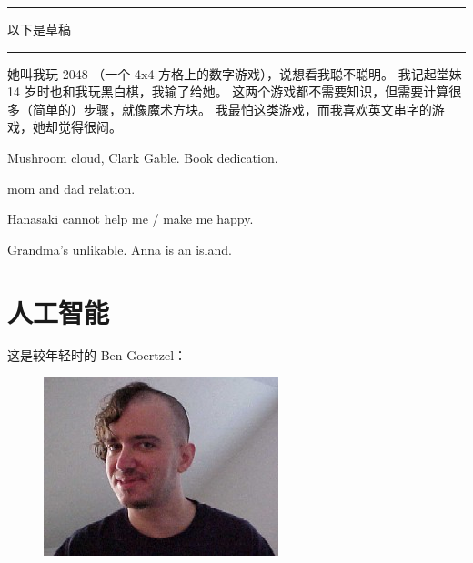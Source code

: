 \documentclass[12pt]{report}
\newcommand*\todo{\begin{center}\color{red}  \rule{5cm}{0.5pt} 以下是草稿\, \rule{5cm}{0.5pt} \end{center}}
\begin{document}
\todo

她叫我玩 2048 （一个 4x4 方格上的数字游戏），说想看我聪不聪明。 我记起堂妹 14 岁时也和我玩黑白棋，我输了给她。  这两个游戏都不需要知识，但需要计算很多（简单的）步骤，就像魔术方块。  我最怕这类游戏，而我喜欢英文串字的游戏，她却觉得很闷。

Mushroom cloud, Clark Gable.  Book dedication.

mom and dad relation.

Hanasaki cannot help me / make me happy.

Grandma's unlikable.  Anna is an island.

\chapter{人工智能}

这是较年轻时的 Ben Goertzel：
\begin{figure}[H]
\centering
\includegraphics[scale=2.5]{benbenben.jpg}
\end{figure}
\end{document}

